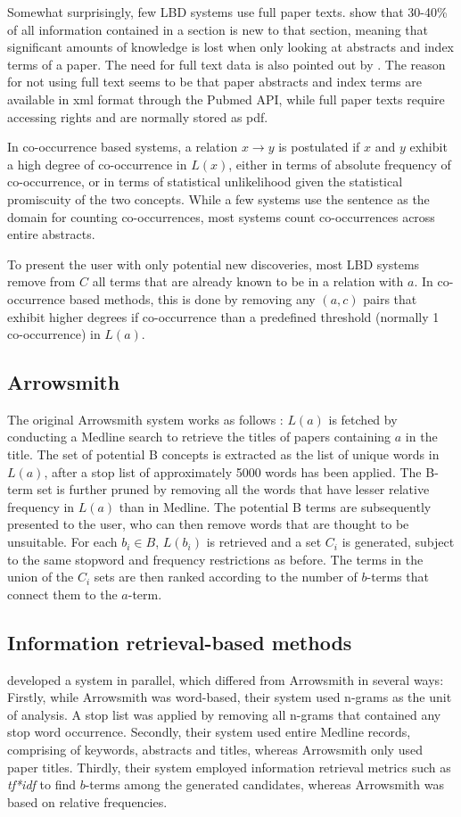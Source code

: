 Somewhat surprisingly, few LBD systems use full paper texts.  \citet{sch04} show that 30-40\% of all information contained in a section is new to that section, meaning that significant amounts of knowledge is lost when only looking at abstracts and index terms of a paper. The need for full text data is also pointed out by \citet{cam13}. The reason for not using full text seems to be that paper abstracts and index terms are available in xml format through the Pubmed API, while full paper texts require accessing rights and are normally stored as pdf.

In co-occurrence based systems, a relation $x \to y$ is postulated if $x$ and $y$ exhibit a high degree of co-occurrence in $L(x)$, either in terms of absolute frequency of co-occurrence, or in terms of statistical unlikelihood given the statistical promiscuity of the two concepts. While a few systems use the sentence as the domain for counting co-occurrences, most systems count co-occurrences across entire abstracts. 

To present the user with only potential new discoveries, most LBD systems remove from $C$ all terms that are already known to be in a relation with $a$. In co-occurrence based methods, this is done by removing any $(a,c)$ pairs that exhibit higher degrees if co-occurrence than a predefined threshold (normally 1 co-occurrence) in $L(a)$.

\subsection{Arrowsmith}
The original Arrowsmith system works as follows \cite{swa97}: $L(a)$ is fetched by conducting a Medline search to retrieve the titles of papers containing $a$ in the title. The set of potential B concepts is extracted as the list of unique words in $L(a)$, after a stop list of approximately 5000 words has been applied. The B-term set is further pruned by removing all the words that have lesser relative frequency in $L(a)$ than in Medline. The potential B terms are subsequently presented to the user, who can then remove words that are thought to be unsuitable. For each $b_i \in B$, $L(b_i)$ is retrieved and a set $C_i$ is generated, subject to the same stopword and frequency restrictions as before. The terms in the union of the $C_i$ sets are then ranked according to the number of $b$-terms that connect them to the $a$-term.

\subsection{Information retrieval-based methods}
\citet{gor96} \cite{lin99} developed a system in parallel, which differed from Arrowsmith in several ways: Firstly, while Arrowsmith was word-based, their system used n-grams as the unit of analysis. A stop list was applied by removing all n-grams that contained any stop word occurrence. Secondly, their system used entire Medline records, comprising of keywords, abstracts and titles, whereas Arrowsmith only used paper titles. Thirdly, their system employed information retrieval metrics such as \emph{tf*idf} to find $b$-terms among the generated candidates, whereas Arrowsmith was based on relative frequencies.

